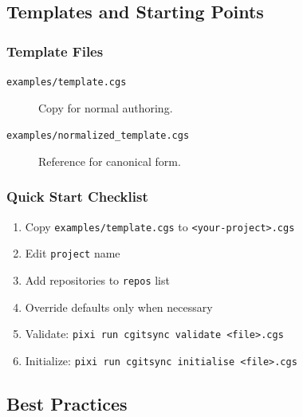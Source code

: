 \subsection{Templates and Starting Points}
\label{subsec:cgs-templates}

\subsubsection{Template Files}

\begin{description}
  \item[\texttt{examples/template.cgs}] Copy for normal authoring.
  \item[\texttt{examples/normalized\_template.cgs}] Reference for canonical form.
\end{description}

\subsubsection{Quick Start Checklist}

\begin{enumerate}
  \item Copy \texttt{examples/template.cgs} to \texttt{<your-project>.cgs}
  \item Edit \texttt{project} name
  \item Add repositories to \texttt{repos} list
  \item Override defaults only when necessary
  \item Validate: \texttt{pixi run cgitsync validate <file>.cgs}
  \item Initialize: \texttt{pixi run cgitsync initialise <file>.cgs}
\end{enumerate}

\subsection{Best Practices}
\label{subsec:cgs-best-practices}

